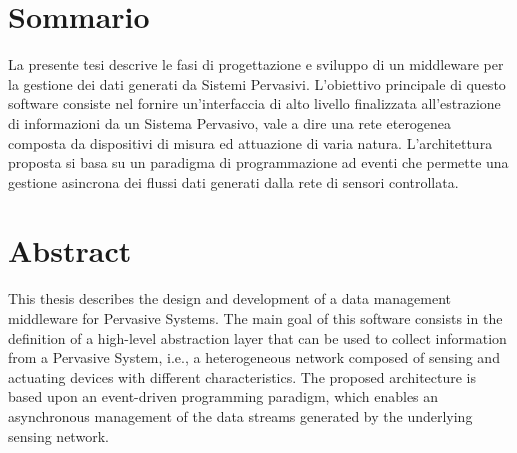\chapter*{Sommario}

La presente tesi descrive le fasi di progettazione e sviluppo di un middleware
per la gestione dei dati generati da Sistemi Pervasivi. L'obiettivo principale
di questo software consiste nel fornire un'interfaccia di alto livello
finalizzata all'estrazione di informazioni da un Sistema Pervasivo, vale a dire
una rete eterogenea composta da dispositivi di misura ed attuazione di varia
natura. L'architettura proposta si basa su un paradigma di programmazione ad
eventi che permette una gestione asincrona dei flussi dati generati dalla rete
di sensori controllata.

\chapter*{Abstract}

This thesis describes the design and development of a data management
middleware for Pervasive Systems. The main goal of this software consists in
the definition of a high-level abstraction layer that can be used to collect
information from a Pervasive System, i.e., a heterogeneous network composed of
sensing and actuating devices with different characteristics. The proposed
architecture is based upon an event-driven programming paradigm, which enables
an asynchronous management of the data streams generated by the underlying
sensing network.
